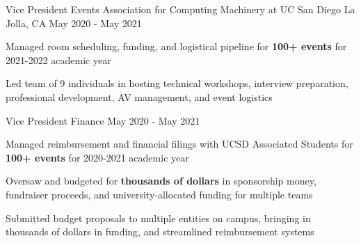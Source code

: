 \begin{cventries}
  \cventrytwo
    {Vice President Events} %
    {Association for Computing Machinery at UC San Diego} %
    {La Jolla, CA} %
    {May 2020 - May 2021} %
    {
      \begin{cvitems} %
        \item {Managed room scheduling, funding, and logistical pipeline for \textbf{100+ events} for 2021-2022 academic year}
        \item {Led team of 9 individuals in hosting technical workshops, interview preparation, professional development, AV management, and event logistics}
      \end{cvitems}
    }
    {Vice President Finance}
    {May 2020 - May 2021} %
    {
      \begin{cvitems} %
        \item {Managed reimbursement and financial filings with UCSD Associated Students for \textbf{100+ events} for 2020-2021 academic year}
        \item {Oversaw and budgeted for \textbf{thousands of dollars} in sponsorship money, fundraiser proceeds, and university-allocated funding for multiple teams}
        \item {Submitted budget proposals to multiple entities on campus, bringing in thousands of dollars in funding, and streamlined reimbursement systems}
      \end{cvitems}
    }


\end{cventries}
